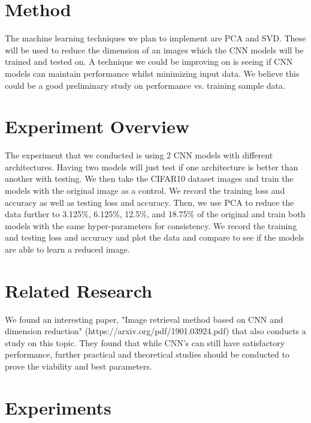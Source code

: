 \documentclass{article}
\begin{document}
\section{Method}

The machine learning techniques we plan to implement are PCA and SVD. These will be used to reduce the dimension of an images which the CNN models will be trained and tested on. A technique we could be improving on is seeing if CNN models can maintain performance whilst minimizing input data. We believe this could be a good preliminary study on performance vs. training sample data. 

\section{Experiment Overview}

The experiment that we conducted is using 2 CNN models with different architectures. Having two models will just test if one architecture is better than another with testing. We then take the CIFAR10 dataset images and train the models with the original image as a control. We record the training loss and accuracy as well as testing loss and accuracy. Then, we use PCA to reduce the data further to 3.125\%, 6.125\%, 12.5\%, and 18.75\% of the original and train both models with the same hyper-parameters for consistency. We record the training and testing loss and accuracy and plot the data and compare to see if the models are able to learn a reduced image. 

\section{Related Research}

We found an interesting paper, "Image retrieval method based on CNN and
dimension reduction" (https://arxiv.org/pdf/1901.03924.pdf) that also conducts a study on this topic. They found that while CNN's can still have satisfactory performance, further practical and theoretical studies should be conducted to prove the viability and best parameters. 


\section{Experiments}
\end{document}

